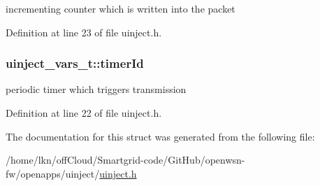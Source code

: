 incrementing counter which is written into the packet 



Definition at line 23 of file uinject.\+h.

\subsubsection[{\texorpdfstring{timer\+Id}{timerId}}]{ uinject\+\_\+vars\+\_\+t\+::timer\+Id}\hypertarget{structuinject__vars__t_a18a921b840a55a17d55c43086741b74a}{}\label{structuinject__vars__t_a18a921b840a55a17d55c43086741b74a}


periodic timer which triggers transmission 



Definition at line 22 of file uinject.\+h.



The documentation for this struct was generated from the following file\+:\begin{DoxyCompactItemize}
\item 
/home/lkn/off\+Cloud/\+Smartgrid-\/code/\+Git\+Hub/openwsn-\/fw/openapps/uinject/\hyperlink{uinject_8h}{uinject.\+h}\end{DoxyCompactItemize}
